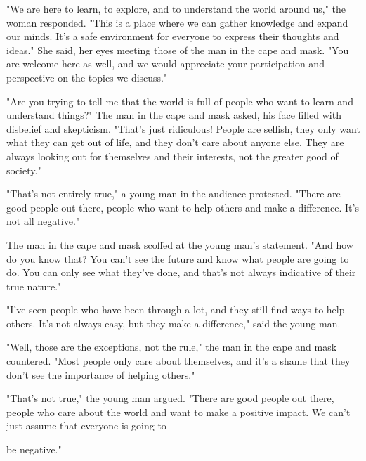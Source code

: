 \documentclass[smalldemyvopaper,11pt,twoside,onecolumn,openright,extrafontsizes]{memoir}
\begin{document}
"We are here to learn, to explore, and to understand the world around us," the woman responded. "This is a place where we can gather knowledge and expand our minds. It's a safe environment for everyone to express their thoughts and ideas." She said, her eyes meeting those of the man in the cape and mask. "You are welcome here as well, and we would appreciate your participation and perspective on the topics we discuss."\par
"Are you trying to tell me that the world is full of people who want to learn and understand things?" The man in the cape and mask asked, his face filled with disbelief and skepticism. "That's just ridiculous! People are selfish, they only want what they can get out of life, and they don't care about anyone else. They are always looking out for themselves and their interests, not the greater good of society."\par
"That's not entirely true," a young man in the audience protested. "There are good people out there, people who want to help others and make a difference. It's not all negative."\par
The man in the cape and mask scoffed at the young man's statement. "And how do you know that? You can't see the future and know what people are going to do. You can only see what they've done, and that's not always indicative of their true nature."\par
"I've seen people who have been through a lot, and they still find ways to help others. It's not always easy, but they make a difference," said the young man.\par
"Well, those are the exceptions, not the rule," the man in the cape and mask countered. "Most people only care about themselves, and it's a shame that they don't see the importance of helping others."\par
"That's not true," the young man argued. "There are good people out there, people who care about the world and want to make a positive impact. We can't just assume that everyone is going to\par
be negative."\par
\end{document}
